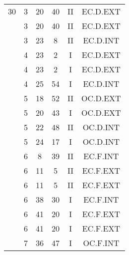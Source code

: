 \documentclass[12pt, a4paper]{article}
\begin{document}
\begin{multicols}{3}
{\begin{tabular}{c c c c c c}
	 	 	 	30 & 3 & 20 & 40 & II & EC.D.EXT\\%
	 	 	 	 & 3 & 20 & 40 & II & EC.D.EXT\\%
	 	 	 	 & 3 & 23 & 8 & II & EC.D.INT\\%
	 	 	 	 & 4 & 23 & 2 & I & EC.D.EXT\\%
	 	 	 	 & 4 & 23 & 2 & I & EC.D.EXT\\%
	 	 	 	 & 4 & 25 & 54 & I & EC.D.INT\\%
	 	 	 	 & 5 & 18 & 52 & II & OC.D.EXT\\%
	 	 	 	 & 5 & 20 & 43 & I & OC.D.EXT\\%
	 	 	 	 & 5 & 22 & 48 & II & OC.D.INT\\%
	 	 	 	 & 5 & 24 & 17 & I & OC.D.INT\\%
	 	 	 	 & 6 & 8 & 39 & II & EC.F.INT\\%
	 	 	 	 & 6 & 11 & 5 & II & EC.F.EXT\\%
	 	 	 	 & 6 & 11 & 5 & II & EC.F.EXT\\%
	 	 	 	 & 6 & 38 & 30 & I & EC.F.INT\\%
	 	 	 	 & 6 & 41 & 20 & I & EC.F.EXT\\%
	 	 	 	 & 6 & 41 & 20 & I & EC.F.EXT\\%
	 	 	 	 & 7 & 36 & 47 & I & OC.F.INT\\%
	 	 \end{tabular}
 	}
\end{multicols}
\end{document}
